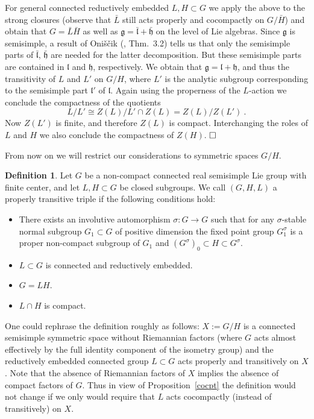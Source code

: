\documentclass[10]{amsart}
\theoremstyle{remark}
\theoremstyle{definition}
\newtheorem{Def}[thm]{Definition}
\numberwithin{equation}{section}
\newcommand{\fg}{{\mathfrak g}}
\newcommand{\fh}{{\mathfrak h}}
\newcommand{\fl}{{\mathfrak l}}
\newcommand{\defn}{{:=}}
\begin{document}
{For general connected reductively embedded $L,H\subset G$ we apply the above to the strong closures (observe that $\bar L$ still acts properly and cocompactly on $G/\bar H$) and obtain that $G=\bar L\bar H$ as well as $\fg=\bar\fl+\bar\fh$ on the level of Lie algebras. Since $\fg$ is semisimple, a result of Oni\v s\v cik (\cite{Oni69}, Thm.~3.2) tells us that only the
semisimple parts of  $\bar\fl$, $\bar\fh$ are needed for the latter decomposition. But these semisimple parts are contained in $\fl$ and $\fh$, respectively.
We obtain that $\fg=\fl+\fh$, and thus the transitivity of $L$ and $L'$ on $G/H$, where $L'$ is the analytic subgroup corresponding to the semisimple part $\fl'$ of $\fl$.
Again using the properness of the $L$-action we conclude the compactness of the quotients
$$L/L'\cong Z(L)/L'\cap Z(L)=Z(L)/Z(L')\ .$$
Now $Z(L')$ is finite, and therefore $Z(L)$ is compact. Interchanging the roles of $L$ and $H$ we also conclude the compactness of $Z(H)$. 
$\hfill\Box$
%


From now on we will restrict our considerations to symmetric spaces $G/H$. 
%
\begin{Def}\label{defck}
Let $G$ be a non-compact connected real semisimple Lie group with finite center, and let $L,H\subset G$ be closed subgroups.
We call $(G,H,L)$ a properly transitive triple if the following conditions hold:
\begin{itemize}
\item[(i)] There exists an involutive automorphism $\sigma: G\rightarrow G$ such that for any $\sigma$-stable normal subgroup $G_1\subset G$  of positive dimension the
fixed point group $G_1^\sigma$ is a proper non-compact subgroup of $G_1$
 and $(G^\sigma)_0\subset H\subset G^\sigma$.
\item[(ii)] $L\subset G$ is connected and reductively embedded.
\item[(iii)] $G=LH$.
\item[(iv)] $L\cap H$ is compact.
\end{itemize}
\end{Def}
One could rephrase the definition roughly as follows: $X\defn G/H$ is a connected semisimple symmetric space without Riemannian factors (where $G$ acts almost effectively by the full
identity component of the isometry group) and the reductively embedded connected group $L\subset G$ acts properly and transitively on $X$. Note that the absence of Riemannian
factors of $X$ implies the absence of compact factors of $G$. Thus in view of Proposition~\ref{cocpt}
the definition would not change if we only would require that $L$ acts cocompactly (instead of transitively) on $X$.

}
\end{document}
